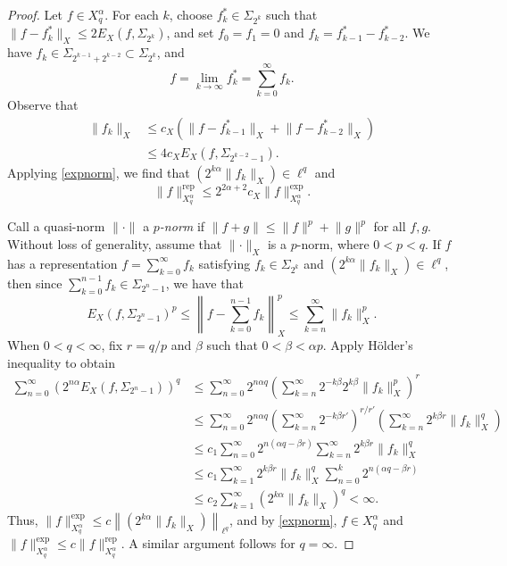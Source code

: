 \documentclass{article}
\theoremstyle{definition}
\theoremstyle{remark}
\begin{document}
\begin{proof}
    Let $f \in X_q^\alpha$. For each $k$, choose $f_k^* \in \Sigma_{2^k}$ such that $\lVert f-f_k^* \rVert_X \leq 2E_X(f,\Sigma_{2^k})$, and set $f_0 = f_1 =0$ and $f_k = f_{k-1}^*-f_{k-2}^*$. We have $f_k \in \Sigma_{2^{k-1}+2^{k-2}} \subset \Sigma_{2^k}$, and
    \[f = \lim_{k \to \infty} f_k^* = \sum_{k=0}^\infty f_k.\]
    Observe that
    \begin{align*}
        \lVert f_k \rVert_X &\leq c_X(\lVert f-f_{k-1}^* \rVert_X + \lVert f-f_{k-2}^* \rVert_X) \\
        &\leq 4c_X E_X(f,\Sigma_{2^{k-2}-1}).
    \end{align*}
    Applying \ref{expnorm}, we find that $\left( 2^{k\alpha} \lVert f_k \rVert_X \right) \in \ell^q$ and
    \[\lVert f \rVert_{X_q^\alpha}^\mathrm{rep} \leq 2^{2\alpha+2}c_X \lVert f \rVert_{X_q^\alpha}^\mathrm{exp}.\]

    Call a quasi-norm $\lVert \cdot \rVert$ a $p$\textit{-norm} if $\lVert f+g \rVert \leq \lVert f \rVert^p + \lVert g \rVert^p$ for all $f,g$. Without loss of generality, assume that $\lVert \cdot \rVert_X$ is a $p$-norm, where $0 < p < q$. If $f$ has a representation $f = \sum_{k=0}^\infty f_k$ satisfying $f_k \in \Sigma_{2^k}$ and $\left( 2^{k\alpha} \lVert f_k \rVert_X \right) \in \ell^q$, then since $\sum_{k=0}^{n-1} f_k \in \Sigma_{2^n-1}$, we have that
    \[E_X(f,\Sigma_{2^n-1})^p \leq \left\lVert f - \sum_{k=0}^{n-1} f_k \right\rVert_X^p \leq \sum_{k=n}^{\infty} \lVert f_k \rVert_X^p.\]
    When $0 < q < \infty$, fix $r = q/p$ and $\beta$ such that $0 < \beta < \alpha p$. Apply H{\"o}lder's inequality to obtain
    \begin{align*}
        \sum_{n=0}^\infty (2^{n\alpha}E_X(f,\Sigma_{2^n-1}))^q &\leq \sum_{n=0}^\infty 2^{n\alpha q}\left( \sum_{k=n}^{\infty} 2^{-k\beta}2^{k\beta}\lVert f_k \rVert_X^p \right)^r \\
        &\leq \sum_{n=0}^\infty 2^{n\alpha q}\left( \sum_{k=n}^{\infty} 2^{-k\beta r'} \right)^{r/r'} \left( \sum_{k=n}^{\infty} 2^{k\beta r}\lVert f_k \rVert_X^q \right) \\
        &\leq c_1\sum_{n=0}^\infty 2^{n(\alpha q - \beta r)}\sum_{k=n}^{\infty} 2^{k\beta r}\lVert f_k \rVert_X^q \\
        &\leq c_1\sum_{k=1}^{\infty} 2^{k\beta r}\lVert f_k \rVert_X^q \sum_{n=0}^k 2^{n(\alpha q - \beta r)} \\
        &\leq c_2\sum_{k=1}^{\infty} (2^{k\alpha}\lVert f_k \rVert_X)^q < \infty.
    \end{align*}
    Thus, $\lVert f \rVert_{X_q^\alpha}^\mathrm{exp} \leq c\left\lVert \left( 2^{k\alpha} \lVert f_k \rVert_X \right) \right\rVert_{\ell^q}$, and by \ref{expnorm}, $f \in X_q^\alpha$ and $\lVert f \rVert_{X_q^\alpha}^\mathrm{exp} \leq c\lVert f \rVert_{X_q^\alpha}^\mathrm{rep}$. A similar argument follows for $q = \infty$.
\end{proof}
\end{document}
